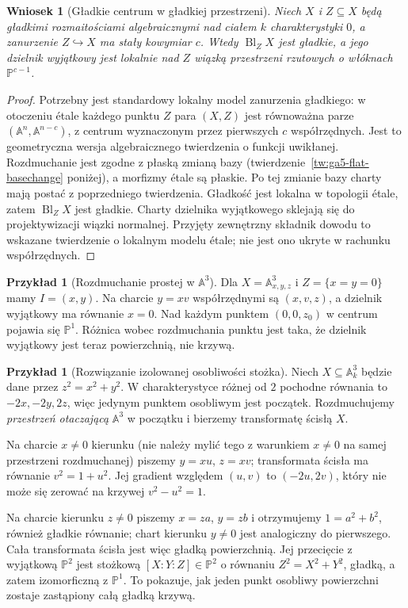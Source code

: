\documentclass[11pt,a4paper,openany]{report}
\numberwithin{equation}{section}
\theoremstyle{plain}
\newtheorem{wniosek}[twierdzenie]{Wniosek}
\theoremstyle{definition}
\newtheorem{przyklad}[twierdzenie]{Przykład}
\theoremstyle{remark}
\newcommand{\A}{\mathbb A}
\newcommand{\PP}{\mathbb P}
\begin{document}
\begin{wniosek}[Gładkie centrum w gładkiej przestrzeni]
\label{wn:ga5-smooth-center}
Niech $X$ i $Z\subseteq X$ będą gładkimi rozmaitościami
algebraicznymi nad ciałem $k$ charakterystyki $0$,
a zanurzenie $Z\hookrightarrow X$ ma stały kowymiar $c$.
Wtedy $\operatorname{Bl}_Z X$ jest gładkie, a jego
dzielnik wyjątkowy jest lokalnie nad $Z$ wiązką
przestrzeni rzutowych o włóknach $\PP^{c-1}$.
\end{wniosek}
\begin{proof}
Potrzebny jest standardowy lokalny model zanurzenia
gładkiego: w otoczeniu étale każdego punktu $Z$
para $(X,Z)$ jest równoważna parze
$(\A^n,\A^{n-c})$, z centrum wyznaczonym przez
pierwszych $c$ współrzędnych. Jest to geometryczna
wersja algebraicznego twierdzenia o funkcji uwikłanej.
Rozdmuchanie jest zgodne z płaską zmianą bazy
(twierdzenie~\ref{tw:ga5-flat-basechange} poniżej),
a morfizmy étale są płaskie. Po tej zmianie bazy
charty mają postać z poprzedniego twierdzenia.
Gładkość jest lokalna w topologii étale, zatem
$\operatorname{Bl}_Z X$ jest gładkie. Charty dzielnika
wyjątkowego sklejają się do projektywizacji wiązki
normalnej. Przyjęty zewnętrzny składnik dowodu to
wskazane twierdzenie o lokalnym modelu étale;
nie jest ono ukryte w rachunku współrzędnych.
\end{proof}

\begin{przyklad}[Rozdmuchanie prostej w $\A^3$]
Dla $X=\A^3_{x,y,z}$ i $Z=\{x=y=0\}$
mamy $I=(x,y)$. Na charcie $y=xv$ współrzędnymi
są $(x,v,z)$, a dzielnik wyjątkowy ma równanie
$x=0$. Nad każdym punktem $(0,0,z_0)$ w centrum
pojawia się $\PP^1$. Różnica wobec rozdmuchania
punktu jest taka, że dzielnik wyjątkowy jest teraz
powierzchnią, nie krzywą.
\end{przyklad}

\begin{przyklad}[Rozwiązanie izolowanej osobliwości stożka]
\label{prz:ga5-cone}
Niech $X\subseteq\A^3_k$ będzie dane przez
$z^2=x^2+y^2$. W charakterystyce różnej od $2$
pochodne równania to $-2x,-2y,2z$, więc jedynym
punktem osobliwym jest początek. Rozdmuchujemy
\emph{przestrzeń otaczającą} $\A^3$ w początku
i bierzemy transformatę ścisłą $X$.

Na charcie $x\ne0$ kierunku (nie należy mylić tego
z warunkiem $x\ne0$ na samej przestrzeni rozdmuchanej)
piszemy $y=xu$, $z=xv$; transformata ścisła ma
równanie $v^2=1+u^2$. Jej gradient względem
$(u,v)$ to $(-2u,2v)$, który nie może się zerować
na krzywej $v^2-u^2=1$.

Na charcie kierunku $z\ne0$ piszemy
$x=za$, $y=zb$ i otrzymujemy $1=a^2+b^2$,
również gładkie równanie; chart kierunku $y\ne0$
jest analogiczny do pierwszego. Cała transformata
ścisła jest więc gładką powierzchnią.
Jej przecięcie z wyjątkową $\PP^2$ jest stożkową
$[X:Y:Z]\in\PP^2$ o równaniu $Z^2=X^2+Y^2$,
gładką, a zatem izomorficzną z $\PP^1$.
To pokazuje, jak jeden punkt osobliwy powierzchni
zostaje zastąpiony całą gładką krzywą.
\end{przyklad}
\end{document}
